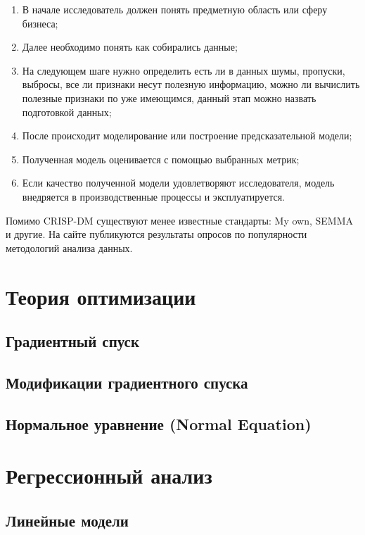 \begin{enumerate}[label=\arabic*.]
    \item В начале исследователь должен понять предметную область или сферу бизнеса;
    \item Далее необходимо понять как собирались данные;
    \item На следующем шаге нужно определить есть ли в данных шумы, пропуски, выбросы, все ли признаки несут полезную информацию, можно ли вычислить полезные признаки по уже имеющимся, данный этап можно назвать подготовкой данных;
    \item После происходит моделирование или построение предсказательной модели;
    \item Полученная модель оценивается с помощью выбранных метрик;
    \item Если качество полученной модели удовлетворяют исследователя, модель внедряется в производственные процессы и эксплуатируется.
\end{enumerate}
Помимо CRISP-DM существуют менее известные стандарты: My own, SEMMA и другие. На сайте \cite{poll:crisp_dm} публикуются результаты опросов по популярности методологий анализа данных.



\section{Теория оптимизации}

\subsection{Градиентный спуск}

\subsection{Модификации градиентного спуска}

\subsection{Нормальное уравнение (Normal Equation)}



\section{Регрессионный анализ}


\subsection{Линейные модели}

